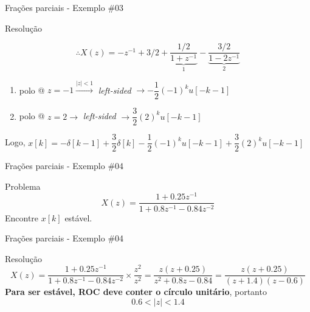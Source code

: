 \begin{frame}{Frações parciais - Exemplo \#03}
\begin{block}{Resolução}
	\begin{minipage}{0.45\linewidth}
		\[ \therefore X(z)=-z^{-1}+3/2+\underbrace{\dfrac{1/2}{1+z^{-1}}}_{1}-\underbrace{\dfrac{3/2}{1-2z^{-1}}}_{2} \]
		
		\begin{enumerate}
			\item polo @ $ z=-1 \overset{|z|<1}{\longrightarrow} $ \textit{left-sided} $ \rightarrow -\dfrac{1}{2}(-1)^{k}u[-k-1] $
			\item polo @ $ z=2 \rightarrow $ \textit{left-sided} $ \rightarrow \dfrac{3}{2}(2)^{k}u[-k-1] $
		\end{enumerate}
	\end{minipage}
	\hfill
	\begin{minipage}{0.45\linewidth}
		\centering
		\scalebox{0.7}{}
	\end{minipage}
	
	Logo, $ x[k]=-\delta[k-1]+\dfrac{3}{2}\delta[k]-\dfrac{1}{2}(-1)^{k}u[-k-1]+\dfrac{3}{2}(2)^{k}u[-k-1] $
\end{block}
\end{frame}


\begin{frame}{Frações parciais - Exemplo \#04}
\begin{block}{Problema}
	$$ X(z)=\dfrac{1+\num{0,25}z^{-1}}{1+\num{0,8}z^{-1}-\num{0,84}z^{-2}} $$
Encontre $ x[k] $ estável.
\end{block}
\end{frame}


\begin{frame}{Frações parciais - Exemplo \#04}
	\begin{block}{Resolução}
			\[ X(z)=\dfrac{1+\num{0,25}z^{-1}}{1+\num{0,8}z^{-1}-\num{0,84}z^{-2}}\times\dfrac{z^{2}}{z^{2}}=\dfrac{z(z+\num{0,25})}{z^{2}+\num{0,8}z-\num{0,84}}=\dfrac{z(z+\num{0,25})}{(z+\num{1,4})(z-\num{0,6})} \]
		\textbf{Para ser estável, ROC deve conter o círculo unitário}, portanto \[ \num{0,6}<|z|<\num{1,4} \]
	\end{block}
	\centering
	\scalebox{0.6}{}
\end{frame}


